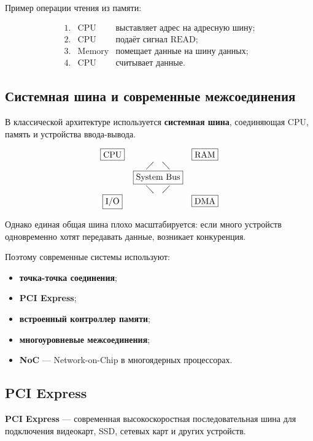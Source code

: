 \documentclass[12pt,a4paper]{article}
\theoremstyle{remark}
\begin{document}
Пример операции чтения из памяти:

\[
\begin{array}{rcl}
1. & \text{CPU} & \text{выставляет адрес на адресную шину;} \\
2. & \text{CPU} & \text{подаёт сигнал READ;} \\
3. & \text{Memory} & \text{помещает данные на шину данных;} \\
4. & \text{CPU} & \text{считывает данные.}
\end{array}
\]

\subsection{Системная шина и современные межсоединения}

В классической архитектуре используется \textbf{системная шина}, соединяющая CPU, память и устройства ввода-вывода.

\[
\begin{array}{ccc}
\boxed{\text{CPU}} & & \boxed{\text{RAM}} \\
 & \diagup \quad \diagdown & \\
 & \boxed{\text{System Bus}} & \\
 & \diagdown \quad \diagup & \\
\boxed{\text{I/O}} & & \boxed{\text{DMA}}
\end{array}
\]

Однако единая общая шина плохо масштабируется: если много устройств одновременно хотят передавать данные, возникает конкуренция.

Поэтому современные системы используют:
\begin{itemize}
    \item \textbf{точка-точка соединения};
    \item \textbf{PCI Express};
    \item \textbf{встроенный контроллер памяти};
    \item \textbf{многоуровневые межсоединения};
    \item \textbf{NoC} --- Network-on-Chip в многоядерных процессорах.
\end{itemize}

\subsection{PCI Express}

\textbf{PCI Express} --- современная высокоскоростная последовательная шина для подключения видеокарт, SSD, сетевых карт и других устройств.
\end{document}
